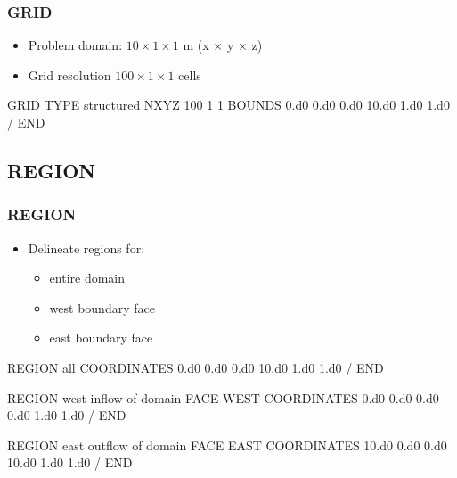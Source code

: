\documentclass{beamer}
\newcommand\bluecomment[1]{{{\color{blue} #1}}}
\begin{document}
\begin{frame}\frametitle{GRID}

\begin{itemize}
  \item Problem domain: $10 \times 1 \times 1$ m (x $\times$ y $\times$ z)
  \item Grid resolution $100 \times 1 \times 1$ cells
\end{itemize}

\begin{semiverbatim}
GRID
  TYPE structured
  NXYZ 100 1 1
  BOUNDS
    0.d0 0.d0 0.d0
    10.d0 1.d0 1.d0
  /
END
\end{semiverbatim}

\end{frame}

\subsection{REGION}

\begin{frame}\frametitle{REGION}

\begin{itemize}
  \item Delineate regions for:
  \begin{itemize}
    \item entire domain
    \item west boundary face
    \item east boundary face
  \end{itemize}
\end{itemize}

\begin{semiverbatim}
REGION all
  COORDINATES
    0.d0  0.d0 0.d0
    10.d0 1.d0 1.d0
  /
END

\newpage
REGION west        \bluecomment{inflow of domain}
  FACE WEST
  COORDINATES
    0.d0 0.d0 0.d0
    0.d0 1.d0 1.d0
  /
END

REGION east           \bluecomment{outflow of domain}
  FACE EAST
  COORDINATES
    10.d0 0.d0 0.d0
    10.d0 1.d0 1.d0
  /
END
\end{semiverbatim}

\end{frame}


\end{document}
